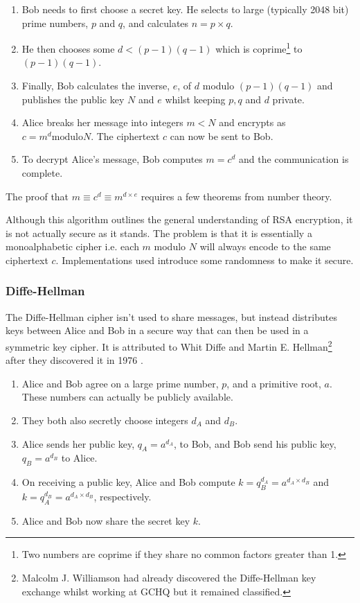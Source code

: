 \begin{enumerate}
	\item Bob needs to first choose a secret key. He selects to large (typically 2048 bit) prime numbers, $p$ and $q$, and calculates $n = p \times q$.
	\item He then chooses some $d < (p-1)(q-1)$ which is coprime\footnote{Two numbers are coprime if they share no common factors greater than 1.} to $(p-1)(q-1)$.
	\item Finally, Bob calculates the inverse, $e$, of $d$ modulo $(p-1)(q-1)$ and publishes the public key $N$ and $e$ whilst keeping $p,q$ and $d$ private.
	\item Alice breaks her message into integers $m < N$ and encrypts as $c = m^d \mathrm{modulo} N$. The ciphertext $c$ can now be sent to Bob.
	\item To decrypt Alice's message, Bob computes $m = c^d$ and the communication is complete. 
\end{enumerate}   

The proof that $m \equiv c^d \equiv m^{d\times e}$ requires a few theorems from number theory. 

Although this algorithm outlines the general understanding of RSA encryption, it is not actually secure as it stands. The problem is that it is essentially a monoalphabetic cipher i.e. each $m$ modulo $N$ will always encode to the same ciphertext $c$. Implementations used introduce some randomness to make it secure.


\subsubsection*{Diffe-Hellman}

The Diffe-Hellman cipher isn't used to share messages, but instead distributes keys between Alice and Bob in a secure way that can then be used in a symmetric key cipher. It is attributed to Whit Diffe and Martin E. Hellman\footnote{Malcolm J. Williamson had already discovered the Diffe-Hellman key exchange whilst working at GCHQ but it remained classified.} after they discovered it in 1976 \cite{}.

\begin{enumerate}
	\item Alice and Bob agree on a large prime number, $p$, and a primitive root, $a$. These numbers can actually be publicly available.
	\item They both also secretly choose integers $d_A$ and $d_B$.
	\item Alice sends her public key, $q_A = a^{d_A}$, to Bob, and Bob send his public key, $q_B = a^{d_B}$ to Alice.
	\item On receiving a public key, Alice and Bob compute $k = q_B^{d_A} = a^{d_A\times d_B}$ and $k = q_A^{d_B} = a^{d_A\times d_B}$, respectively.
	\item Alice and Bob now share the secret key $k$.
\end{enumerate}

